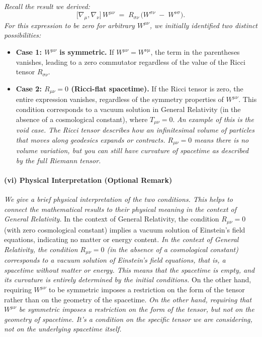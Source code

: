 \documentclass{article}
\begin{document}
\textit{Recall the result we derived:}
\[
\bigl[\nabla_{\mu}, \nabla_{\nu}\bigr]\,W^{\mu\nu} \;=\;
R_{\sigma\nu}\,\bigl(W^{\sigma\nu} \;-\; W^{\nu\sigma}\bigr).
\]
\textit{For this expression to be zero for arbitrary \(W^{\mu\nu}\), we initially identified two distinct possibilities:}

\begin{itemize}
    \item \textbf{Case 1: $W^{\mu\nu}$ is symmetric.} If $W^{\mu\nu} = W^{\nu\mu}$, the term in the parentheses vanishes, leading to a zero commutator regardless of the value of the Ricci tensor \(R_{\sigma\nu}\).

    \item \textbf{Case 2: $R_{\mu\nu} = 0$ (Ricci-flat spacetime).} If the Ricci tensor is zero, the entire expression vanishes, regardless of the symmetry properties of \(W^{\mu\nu}\). This condition corresponds to a vacuum solution in General Relativity (in the absence of a cosmological constant), where \(T_{\mu\nu} = 0\).  \textit{An example of this is the void case. The Ricci tensor describes how an infinitesimal volume of particles that moves along geodesics expands or contracts. \(R_{\mu\nu} = 0\) means there is no volume variation, but you can still have curvature of spacetime as described by the full Riemann tensor.}
\end{itemize}


\paragraph{(vi) Physical Interpretation (Optional Remark)}
\textit{We give a brief physical interpretation of the two conditions. This helps to connect the mathematical results to their physical meaning in the context of General Relativity.}
In the context of General Relativity, the condition $R_{\mu\nu}=0$ (with zero cosmological constant) implies a vacuum solution of Einstein's field equations, indicating no matter or energy content.
\textit{In the context of General Relativity, the condition \(R_{\mu\nu}=0\) (in the absence of a cosmological constant) corresponds to a vacuum solution of Einstein's field equations, that is, a spacetime without matter or energy. This means that the spacetime is empty, and its curvature is entirely determined by the initial conditions.}
On the other hand, requiring $W^{\mu\nu}$ to be symmetric imposes a restriction on the form of the tensor rather than on the geometry of the spacetime.
\textit{On the other hand, requiring that \(W^{\mu\nu}\) be symmetric imposes a restriction on the form of the tensor, but not on the geometry of spacetime. It's a condition on the specific tensor we are considering, not on the underlying spacetime itself.}
\end{document}
